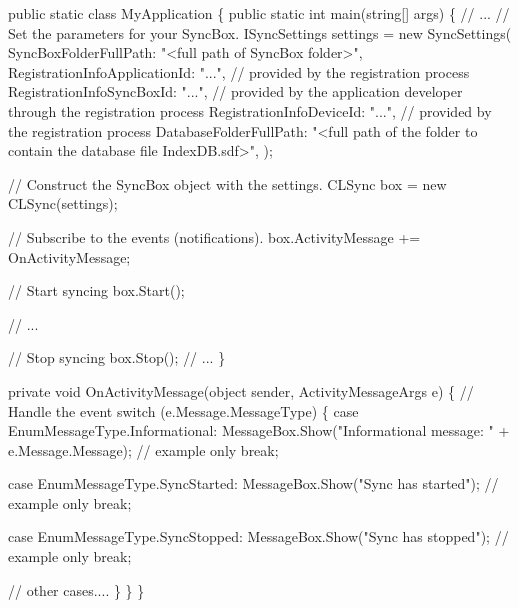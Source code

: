 \begin{DoxyCode}
\textcolor{keyword}{public} \textcolor{keyword}{static} \textcolor{keyword}{class }MyApplication
\{
    \textcolor{keyword}{public} \textcolor{keyword}{static} \textcolor{keywordtype}{int} main(\textcolor{keywordtype}{string}[] args)
    \{
        \textcolor{comment}{// ...}
        \textcolor{comment}{// Set the parameters for your SyncBox.}
        ISyncSettings settings = \textcolor{keyword}{new} SyncSettings(
            SyncBoxFolderFullPath: \textcolor{stringliteral}{"<full path of SyncBox folder>"},
            RegistrationInfoApplicationId: \textcolor{stringliteral}{"..."},   \textcolor{comment}{// provided by the registration process}
            RegistrationInfoSyncBoxId: \textcolor{stringliteral}{"..."},       \textcolor{comment}{// provided by the application developer through the
       registration process}
            RegistrationInfoDeviceId: \textcolor{stringliteral}{"..."},        \textcolor{comment}{// provided by the registration process}
            DatabaseFolderFullPath: \textcolor{stringliteral}{"<full path of the folder to contain the database file IndexDB.sdf>"},
                );
        
        \textcolor{comment}{// Construct the SyncBox object with the settings.}
        CLSync box = \textcolor{keyword}{new} CLSync(settings);

        \textcolor{comment}{// Subscribe to the events (notifications).}
        box.ActivityMessage += OnActivityMessage;
    
        \textcolor{comment}{// Start syncing}
        box.Start(); 
    
        \textcolor{comment}{// ...}
    
        \textcolor{comment}{// Stop syncing}
        box.Stop();
        \textcolor{comment}{// ...}
    \}

    \textcolor{keyword}{private} \textcolor{keywordtype}{void} OnActivityMessage(\textcolor{keywordtype}{object} sender, ActivityMessageArgs e)
    \{
        \textcolor{comment}{// Handle the event}
        \textcolor{keywordflow}{switch} (e.Message.MessageType)
        \{
            \textcolor{keywordflow}{case} EnumMessageType.Informational:
                MessageBox.Show(\textcolor{stringliteral}{"Informational message: "} + e.Message.Message);  \textcolor{comment}{// example only}
                \textcolor{keywordflow}{break};

            \textcolor{keywordflow}{case} EnumMessageType.SyncStarted:
                MessageBox.Show(\textcolor{stringliteral}{"Sync has started"});    \textcolor{comment}{// example only}
                \textcolor{keywordflow}{break};

            \textcolor{keywordflow}{case} EnumMessageType.SyncStopped:
                MessageBox.Show(\textcolor{stringliteral}{"Sync has stopped"});    \textcolor{comment}{// example only}
                \textcolor{keywordflow}{break};

            \textcolor{comment}{// other cases....}
        \}
    \}
\}
\end{DoxyCode}


